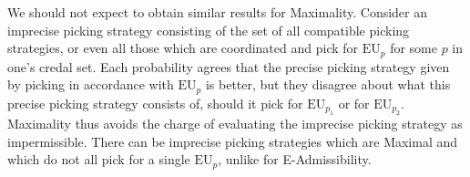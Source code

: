 \documentclass[a4paper]{article}
\newcommand\EU{\mathrm{EU}}
\newcommand{\IB}{\mathbb{B}}
\newenvironment{CCM rewritten}
{\begingroup\color{blue}} %
{\endgroup}              %
\begin{document}
{%
%	
%
We should not expect to obtain similar results for Maximality.
Consider an imprecise picking strategy consisting of the set of all compatible picking strategies, or even all those which are coordinated and pick for $\EU_p$ for some $p$ in one's credal set. Each probability agrees that the precise picking strategy given by picking in accordance with $\EU_p$ is better, but they disagree about what this precise picking strategy consists of, should it pick for $\EU_{p_1}$ or for $\EU_{p_2}$.
Maximality thus avoids the charge of evaluating the imprecise picking strategy as impermissible. There can be imprecise picking strategies which are Maximal and which do not all pick for a single $\EU_p$, unlike for E-Admissibility.


	}
	
\end{document}
